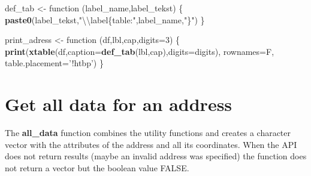 \documentclass[]{article}
\newenvironment{Shaded}{\begin{snugshade}}{\end{snugshade}}
\newcommand{\KeywordTok}[1]{\textcolor[rgb]{0.13,0.29,0.53}{\textbf{{#1}}}}
\newcommand{\DataTypeTok}[1]{\textcolor[rgb]{0.13,0.29,0.53}{{#1}}}
\newcommand{\DecValTok}[1]{\textcolor[rgb]{0.00,0.00,0.81}{{#1}}}
\newcommand{\CharTok}[1]{\textcolor[rgb]{0.31,0.60,0.02}{{#1}}}
\newcommand{\StringTok}[1]{\textcolor[rgb]{0.31,0.60,0.02}{{#1}}}
\newcommand{\NormalTok}[1]{{#1}}
\newcommand{\mytextbf}[1]{\textbf{#1}}
\begin{document}
\begin{Shaded}
\begin{Highlighting}[]
\NormalTok{def_tab <-}\StringTok{ }\NormalTok{function (label_name,label_tekst)  \{ }
  \KeywordTok{paste0}\NormalTok{(label_tekst,}\StringTok{"}\CharTok{\textbackslash{}\textbackslash{}}\StringTok{label\{table:"}\NormalTok{,label_name,}\StringTok{"\}"}\NormalTok{)}
\NormalTok{\}}

\NormalTok{print_adress <-}\StringTok{ }\NormalTok{function (df,lbl,cap,}\DataTypeTok{digits=}\DecValTok{3}\NormalTok{) \{}
  \KeywordTok{print}\NormalTok{(}\KeywordTok{xtable}\NormalTok{(df,}\DataTypeTok{caption=}\KeywordTok{def_tab}\NormalTok{(lbl,cap),}\DataTypeTok{digits=}\NormalTok{digits), }
    \DataTypeTok{rownames=}\NormalTok{F, }\DataTypeTok{table.placement=}\StringTok{'!htbp'}\NormalTok{)}
\NormalTok{\}}
\end{Highlighting}
\end{Shaded}

\section{Get all data for an address}\label{get-all-data-for-an-address}

The \mytextbf{all\_data} function combines the utility functions and
creates a character vector with the attributes of the address and all
its coordinates. When the API does not return results (maybe an invalid
address was specified) the function does not return a vector but the
boolean value FALSE.
\end{document}
